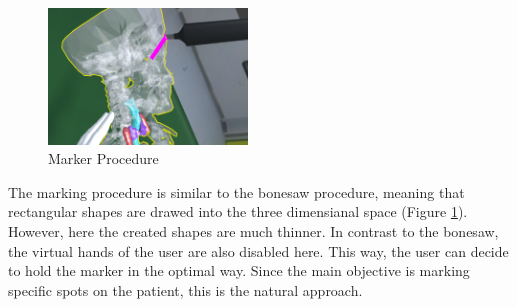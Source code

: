 \begin{figure}[ht]
    \centering
    \includegraphics[width=200px]{images/implementation/features/procedures/marker.png}
    \caption{\label{fig::FeatureMarker}Marker Procedure}
\end{figure}

The marking procedure is similar to the bonesaw procedure, meaning that rectangular shapes are drawed into the three dimensianal space (Figure \ref{fig::FeatureMarker}).
However, here the created shapes are much thinner.
In contrast to the bonesaw, the virtual hands of the user are also disabled here.
This way, the user can decide to hold the marker in the optimal way.
Since the main objective is marking specific spots on the patient, this is the natural approach.